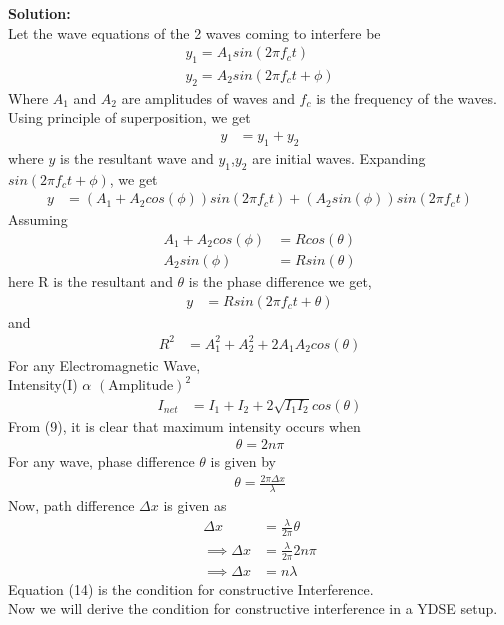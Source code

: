\documentclass[journal,12pt,twocolumn]{IEEEtran}
\theoremstyle{remark}
\begin{document}
\textbf{Solution:}
\\
Let the wave equations of the 2 waves coming to interfere be \begin{align}
    y_1 = A_1sin(2\pi f_ct)\\
    y_2 = A_2sin(2\pi f_ct +\phi)
\end{align}
Where $A_1$ and $A_2$ are amplitudes of waves and $f_c$ is the frequency of the waves. 
Using principle of superposition, we get 
\begin{align}
    y &= y_1+y_2 
\end{align}
where $y$ is the resultant wave and $y_1$,$y_2$ are initial waves. Expanding $sin(2\pi f_ct+\phi)$, we get 
\begin{align}
    y&=(A_1+A_2cos(\phi))sin(2\pi f_ct)+(A_2sin(\phi))sin(2\pi f_ct)
\end{align}
Assuming
\begin{align}
    A_1+A_2cos(\phi)&=Rcos(\theta)\\
    A_2sin(\phi)&=Rsin(\theta)
\end{align}
here R is the resultant and $\theta$ is the phase difference
we get,
\begin{align}
    y&=Rsin(2\pi f_ct+\theta)
\end{align}
and 
\begin{align}
    R^2&=A_1^2+A_2^2+2A_1A_2cos(\theta)
\end{align}
For any Electromagnetic Wave, \\
Intensity(I) $\alpha$ $(\text{Amplitude})^2$
\begin{align}
    I_{net} &= I_1+I_2+2\sqrt{I_1I_2}cos(\theta)
\end{align}
From (9), it is clear that maximum intensity occurs when
\begin{align}
    \theta = 2n\pi
\end{align}
For any wave, phase difference $\theta$ is given by
\begin{align}
    \theta = \frac{2\pi\Delta x}{\lambda}
\end{align}
Now, path difference $\Delta x$ is given as
\begin{align}
    \Delta x &=\frac{\lambda}{2\pi}\theta\\
    \implies\Delta x &= \frac{\lambda}{2\pi}2n\pi\\
    \implies\Delta x &= n\lambda
\end{align}
Equation (14) is the condition for constructive Interference.\\
Now we will derive the condition for constructive interference in a YDSE setup.\\
\end{document}

